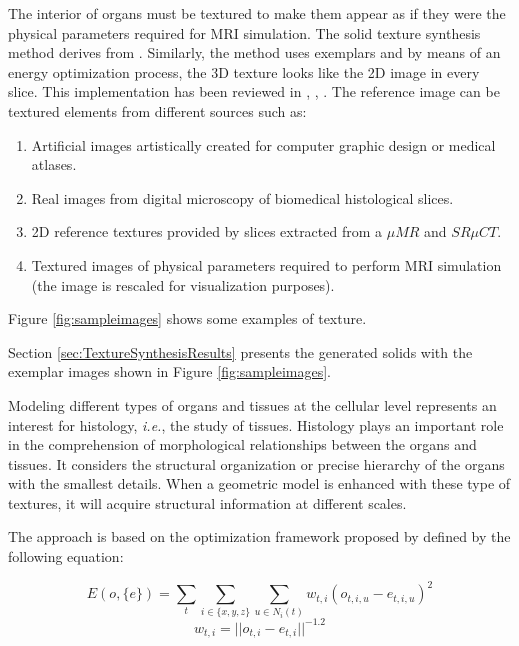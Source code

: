 The interior of organs must be textured to make them 
appear as if they were the physical parameters required for MRI simulation.
The solid texture synthesis method derives from \cite{KFCODLW07}. Similarly, the method uses exemplars and 
by means of an energy optimization process, the 3D texture looks like the 2D image in every slice.
This implementation has been reviewed in \cite{PRIE-12a}, \cite{PRIET-12b}, \cite{PRIE-11}.
The reference image can be textured elements from different sources such as: 
\begin{enumerate}
 \item Artificial images artistically created for computer graphic design or medical atlases.
 \item Real images from digital microscopy of biomedical histological slices.
 \item 2D reference textures provided by slices extracted from a $\mu{MR}$ and $SR \mu{CT}$.
 \item Textured images of physical parameters required to perform MRI simulation (the image is rescaled for visualization purposes). 
\end{enumerate}
Figure \ref{fig:sampleimages} shows some examples of texture. 

Section \ref{sec:TextureSynthesisResults} presents the generated solids with the exemplar images shown in Figure \ref{fig:sampleimages}. 

Modeling different types of organs and tissues at the cellular level represents an interest for histology, 
\emph{i.e.}, the study of tissues. Histology plays an important role in the comprehension of 
morphological relationships between the organs and tissues. It considers the structural organization 
or precise hierarchy of the organs with the smallest details. 
When a geometric model is enhanced with these type of textures, 
it will acquire structural information at different scales.

The approach is based on the optimization framework proposed by \cite{kwatra:2005:SIGGRAPH} 
defined by the following equation:

\begin{equation}
 E(o, \{e\} ) = \sum_{t} \sum_{i \in \{x, y, z\}} \sum_{u \in N_i(t)} w_{t, i} ( o_{t, i, u} - e_{t, i, u} )^2
 \label{equ:imagenergy} 
\end{equation}
\begin{equation}
 w_{t,i} = || o_{t, i} - e_{t, i} ||^{-1.2}
 \label{equ:neighweight}
\end{equation}

